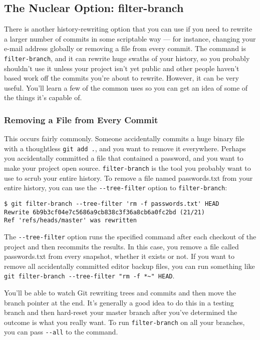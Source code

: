 \documentclass[a4paper]{book}
\newcounter{tab}[chapter]
\begin{document}
\subsection{The Nuclear Option: filter-branch}

There is another history-rewriting option that you can use if you need to rewrite a larger number of commits in some scriptable way --- for instance, changing your e-mail address globally or removing a file from every commit. The command is \texttt{filter-branch}, and it can rewrite huge swaths of your history, so you probably shouldn't use it unless your project isn't yet public and other people haven't based work off the commits you're about to rewrite. However, it can be very useful. You'll learn a few of the common uses so you can get an idea of some of the things it's capable of.

\subsubsection{Removing a File from Every Commit}

This occurs fairly commonly. Someone accidentally commits a huge binary file with a thoughtless \texttt{git add .}, and you want to remove it everywhere. Perhaps you accidentally committed a file that contained a password, and you want to make your project open source. \texttt{filter-branch} is the tool you probably want to use to scrub your entire history. To remove a file named passwords.txt from your entire history, you can use the \texttt{-{}-tree-filter} option to \texttt{filter-branch}:

\begin{shaded}\begin{verbatim}
$ git filter-branch --tree-filter 'rm -f passwords.txt' HEAD
Rewrite 6b9b3cf04e7c5686a9cb838c3f36a8cb6a0fc2bd (21/21)
Ref 'refs/heads/master' was rewritten
\end{verbatim}\end{shaded}

The \texttt{-{}-tree-filter} option runs the specified command after each checkout of the project and then recommits the results. In this case, you remove a file called passwords.txt from every snapshot, whether it exists or not. If you want to remove all accidentally committed editor backup files, you can run something like \texttt{git filter-branch -{}-tree-filter "rm -f *\textasciitilde{}" HEAD}.

You'll be able to watch Git rewriting trees and commits and then move the branch pointer at the end. It's generally a good idea to do this in a testing branch and then hard-reset your master branch after you've determined the outcome is what you really want. To run \texttt{filter-branch} on all your branches, you can pass \texttt{-{}-all} to the command.
\end{document}
